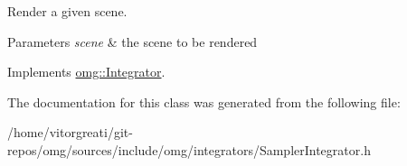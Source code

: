 Render a given scene. 


\begin{DoxyParams}{Parameters}
{\em scene} & the scene to be rendered \\
\hline
\end{DoxyParams}


Implements \mbox{\hyperlink{classomg_1_1_integrator_a9353c1a5abd1396d7c1fcd4f3e250998}{omg\+::\+Integrator}}.



The documentation for this class was generated from the following file\+:\begin{DoxyCompactItemize}
\item 
/home/vitorgreati/git-\/repos/omg/sources/include/omg/integrators/Sampler\+Integrator.\+h\end{DoxyCompactItemize}
